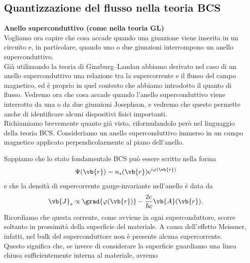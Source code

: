 \subsection{Quantizzazione del flusso nella teoria BCS}
\textbf{Anello superconduttivo (come nella teoria GL)}\\
Vogliamo ora capire che cosa accade quando una giunzione viene inserita in un circuito e, in particolare, quando uno o due giunzioni interrompono un anello superconduttivo.\\
Già utilizzando la teoria di Ginzburg--Landau abbiamo derivato nel caso di un anello superconduttivo una relazione tra la supercorrente e il flusso del campo magnetico, ed è proprio in quel contesto che abbiamo introdotto il quanto di flusso. Vedremo ora che cosa accade quando l'anello superconduttivo viene interrotto da una o da due giunzioni Josephson, e vedremo che questo permette anche di identificare alcuni dispositivi fisici importanti.\\
Richiamiamo brevemente quanto già visto, riformulandolo però nel linguaggio della teoria BCS. Consideriamo un anello superconduttivo immerso in un campo magnetico applicato perpendicolarmente al piano dell'anello.
\begin{figure}[H]
    \centering
\end{figure}
\hspace{-0.6cm}Sappiamo che lo stato fondamentale BCS può essere scritto nella forma
\begin{equation*}
    \Psi(\vb{r})
    =
    n_s(\vb{r}) e^{i \varphi(\vb{r})}
\end{equation*}
e che la densità di supercorrente gauge-invariante nell'anello è data da
\begin{equation*}
    \vb{J}_s
    \propto
    \grad{\varphi(\vb{r})}
    -
    \frac{2e}{\hbar c}\vb{A}(\vb{r}).
\end{equation*}
Ricordiamo che questa corrente, come avviene in ogni superconduttore, scorre soltanto in prossimità della superficie del materiale. A causa dell'effetto Meissner, infatti, nel bulk del superconduttore non è presente alcuna supercorrente.\\
Questo significa che, se invece di considerare la superficie guardiamo una linea chiusa sufficientemente interna al materiale, avremo
